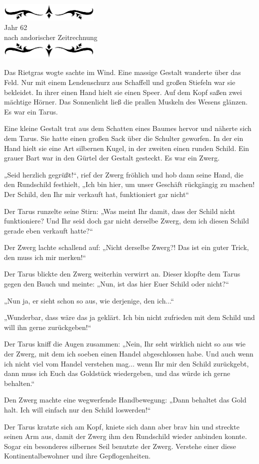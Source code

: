 \documentclass[10pt, a4paper, oneside]{book}
\newcommand{\az}[1]{%
    \begin{center}
        \includegraphics[width=180px]{Das Erbe des Wunderkindes/verzierung1.png}\\
        {\Huge #1} \\
        {nach andorischer Zeitrechnung}\\
        \includegraphics[width=180px]{Das Erbe des Wunderkindes/verzierung2.png}
    \end{center}
    \extramarks{}{#1 a.Z.}
}
\begin{document}
\az{Jahr 62}


Das Rietgras wogte sachte im Wind. Eine massige Gestalt wanderte über das Feld. Nur mit einem Lendenschurz aus Schaffell und großen Stiefeln war sie bekleidet. In ihrer einen Hand hielt sie einen Speer. Auf dem Kopf saßen zwei mächtige Hörner. Das Sonnenlicht ließ die prallen Muskeln des Wesens glänzen. Es war ein Tarus.

Eine kleine Gestalt trat aus dem Schatten eines Baumes hervor und näherte sich dem Tarus. Sie hatte einen großen Sack über die Schulter geworfen. In der ein Hand hielt sie eine Art silbernen Kugel, in der zweiten einen runden Schild. Ein grauer Bart war in den Gürtel der Gestalt gesteckt. Es war ein Zwerg.

„Seid herzlich gegrüßt!“, rief der Zwerg fröhlich und hob dann seine Hand, die den Rundschild festhielt, „Ich bin hier, um unser Geschäft rückgängig zu machen! Der Schild, den Ihr mir verkauft hat, funktioniert gar nicht“

Der Tarus runzelte seine Stirn: „Was meint Ihr damit, dass der Schild nicht funktioniere? Und Ihr seid doch gar nicht derselbe Zwerg, dem ich diesen Schild gerade eben verkauft hatte?“

Der Zwerg lachte schallend auf: „Nicht derselbe Zwerg?! Das ist ein guter Trick, den muss ich mir merken!“

Der Tarus blickte den Zwerg weiterhin verwirrt an. Dieser klopfte dem Tarus gegen den Bauch und meinte: „Nun, ist das hier Euer Schild oder nicht?“

„Nun ja, er sieht schon so aus, wie derjenige, den ich...“

„Wunderbar, dass wäre das ja geklärt. Ich bin nicht zufrieden mit dem Schild und will ihn gerne zurückgeben!“

Der Tarus kniff die Augen zusammen: „Nein, Ihr seht wirklich nicht so aus wie der Zwerg, mit dem ich soeben einen Handel abgeschlossen habe. Und auch wenn ich nicht viel vom Handel verstehen mag... wenn Ihr mir den Schild zurückgebt, dann muss ich Euch das Goldstück wiedergeben, und das würde ich gerne behalten.“

Den Zwerg machte eine wegwerfende Handbewegung: „Dann behaltet das Gold halt. Ich will einfach nur den Schild loswerden!“

Der Tarus kratzte sich am Kopf, kniete sich dann aber brav hin und streckte seinen Arm aus, damit der Zwerg ihm den Rundschild wieder anbinden konnte. Sogar ein besonderes silbernes Seil benutzte der Zwerg. Verstehe einer diese Kontinentalbewohner und ihre Gepflogenheiten.
\end{document}
